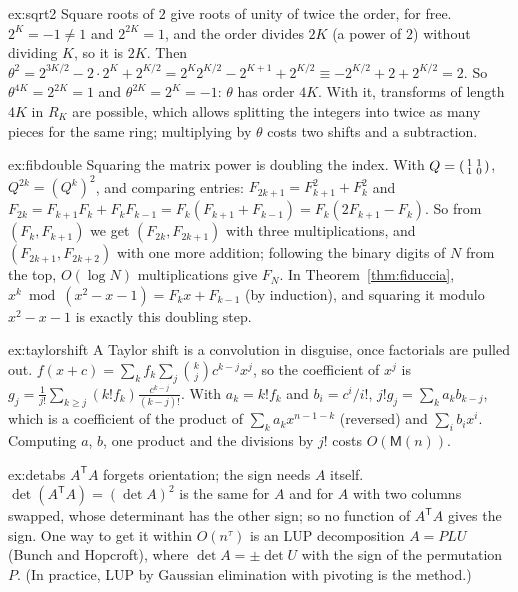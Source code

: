 \begin{solution}{ex:sqrt2}
\idea Square roots of $2$ give roots of unity of twice the order, for free.
\writeup $2^K=-1\ne1$ and $2^{2K}=1$, and the order divides $2K$ (a power of $2$) without dividing $K$, so it is $2K$. Then $\theta^2=2^{3K/2}-2\cdot2^K+2^{K/2}=2^K2^{K/2}-2^{K+1}+2^{K/2}\equiv-2^{K/2}+2+2^{K/2}=2$. So $\theta^{4K}=2^{2K}=1$ and $\theta^{2K}=2^K=-1$: $\theta$ has order $4K$. With it, transforms of length $4K$ in $R_K$ are possible, which allows splitting the
integers into twice as many pieces for the same ring; multiplying by $\theta$ costs two shifts and a subtraction.
\end{solution}

\begin{solution}{ex:fibdouble}
\idea Squaring the matrix power is doubling the index.
\writeup With $Q=\begin{psmallmatrix}1&1\\1&0\end{psmallmatrix}$, $Q^{2k}=(Q^k)^2$, and comparing entries: $F_{2k+1}=F_{k+1}^2+F_k^2$ and $F_{2k}=F_{k+1}F_k+F_kF_{k-1}=F_k(F_{k+1}+F_{k-1})=F_k(2F_{k+1}-F_k)$. So from $(F_k,F_{k+1})$ we get $(F_{2k},F_{2k+1})$ with three multiplications, and $(F_{2k+1},F_{2k+2})$ with one more addition; following the binary digits of $N$ from the top, $O(\log N)$ multiplications give $F_N$. In Theorem~\ref{thm:fiduccia}, $x^k\bmod(x^2-x-1)=F_kx+F_{k-1}$ (by induction), and squaring it modulo $x^2-x-1$ is exactly this doubling step.
\end{solution}

\begin{solution}{ex:taylorshift}
\idea A Taylor shift is a convolution in disguise, once factorials are pulled out.
\writeup $f(x+c)=\sum_kf_k\sum_j\binom kjc^{k-j}x^j$, so the coefficient of $x^j$ is $g_j=\frac1{j!}\sum_{k\ge j}(k!f_k)\frac{c^{k-j}}{(k-j)!}$. With $a_k=k!f_k$ and $b_i=c^i/i!$, $j!g_j=\sum_ka_kb_{k-j}$, which is a coefficient of the product of $\sum_ka_kx^{n-1-k}$ (reversed) and $\sum_ib_ix^i$. Computing $a$, $b$, one product and the divisions by $j!$ costs $O(\mathsf M(n))$.
\end{solution}

\begin{solution}{ex:detabs}
\idea $A^{\mathsf T}A$ forgets orientation; the sign needs $A$ itself.
\writeup $\det(A^{\mathsf T}A)=(\det A)^2$ is the same for $A$ and for $A$ with two columns swapped, whose determinant has the other sign; so no function of $A^{\mathsf T}A$ gives the sign. One way to get it within $O(n^\tau)$ is an LUP decomposition $A=PLU$ (Bunch and Hopcroft), where $\det A=\pm\det U$ with the sign of the permutation $P$. (In practice, LUP by Gaussian elimination with pivoting is the method.)
\end{solution}

